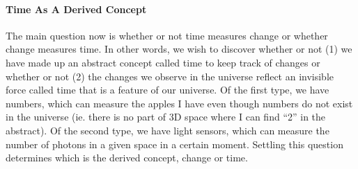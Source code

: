 \documentclass[a4paper, 12pt]{article}
\begin{document}
\paragraph{Time As A Derived Concept}
The main question now is whether or not time measures change or whether change measures time. In other words, we wish to discover whether or not (1) we have made up an abstract concept called time to keep track of changes or whether or not (2) the changes we observe in the universe reflect an invisible force called time that is a feature of our universe. Of the first type, we have numbers, which can measure the apples I have even though numbers do not exist in the universe (ie. there is no part of 3D space where I can find ``2'' in the abstract). Of the second type, we have light sensors, which can measure the number of photons in a given space in a certain moment. Settling this question determines which is the derived concept, change or time. \\
\break
\end{document}
